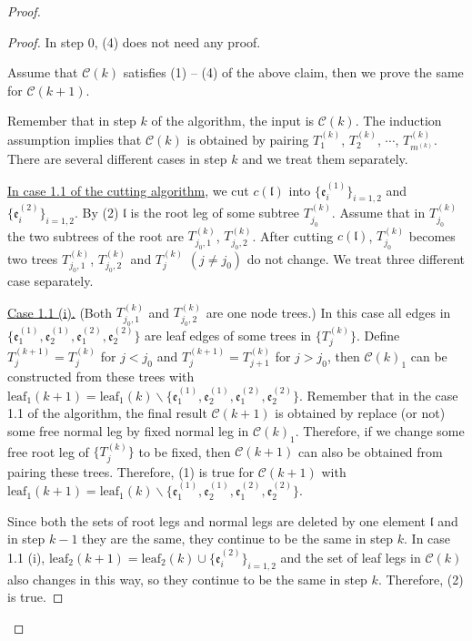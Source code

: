 \begin{proof}
\begin{proof}
In step $0$, (4) does not need any proof.

\medskip

Assume that $\mathcal{C}(k)$ satisfies (1) -- (4) of the above claim, then we prove the same for $\mathcal{C}(k+1)$.

Remember that in step $k$ of the algorithm, the input is $\mathcal{C}(k)$. The induction assumption implies that $\mathcal{C}(k)$ is obtained by pairing $T^{(k)}_1$, $T^{(k)}_2$, $\cdots$, $T^{(k)}_{m^{(k)}}$. There are several different cases in step $k$ and we treat them separately.

\underline{In case 1.1 of the cutting algorithm}, we cut $c(\mathfrak{l})$ into $\{\mathfrak{e}_{i}^{(1)}\}_{i=1,2}$ and $\{\mathfrak{e}_{i}^{(2)}\}_{i=1,2}$. By (2) $\mathfrak{l}$ is the root leg of some subtree $T^{(k)}_{j_0}$. Assume that in $T^{(k)}_{j_0}$ the two subtrees of the root are $T^{(k)}_{j_0,1}$, $T^{(k)}_{j_0,2}$. After cutting $c(\mathfrak{l})$, $T^{(k)}_{j_0}$ becomes two trees $T^{(k)}_{j_0,1}$, $T^{(k)}_{j_0,2}$ and $T^{(k)}_{j}$ $(j\ne j_0)$ do not change. We treat three different case separately.

\underline{Case 1.1 (i).} (Both $T^{(k)}_{j_0,1}$ and $T^{(k)}_{j_0,2}$ are one node trees.) In this case all edges in $\{\mathfrak{e}_{1}^{(1)}, \mathfrak{e}_{2}^{(1)}, \mathfrak{e}_{1}^{(2)}, \mathfrak{e}_{2}^{(2)}\}$ are leaf edges of some trees in $\{T_{j}^{(k)}\}$. Define $T^{(k+1)}_{j}=T^{(k)}_{j}$ for $j< j_0$ and $T^{(k+1)}_{j}=T^{(k)}_{j+1}$ for $j> j_0$, then $\mathcal{C}(k)_1$ can be constructed from these trees with $\text{leaf}_1(k+1)=\text{leaf}_1(k)\backslash\{\mathfrak{e}_{1}^{(1)}, \mathfrak{e}_{2}^{(1)}, \mathfrak{e}_{1}^{(2)}, \mathfrak{e}_{2}^{(2)}\}$. Remember that in the case 1.1 of the algorithm, the final result $\mathcal{C}(k+1)$ is obtained by replace (or not) some free normal leg by fixed normal leg in $\mathcal{C}(k)_1$. Therefore, if we change some free root leg of $\{T^{(k)}_{j}\}$ to be fixed, then $\mathcal{C}(k+1)$ can also be obtained from pairing these trees. Therefore, (1) is true for $\mathcal{C}(k+1)$ with $\text{leaf}_1(k+1)=\text{leaf}_1(k)\backslash\{\mathfrak{e}_{1}^{(1)}, \mathfrak{e}_{2}^{(1)}, \mathfrak{e}_{1}^{(2)}, \mathfrak{e}_{2}^{(2)}\}$.

Since both the sets of root legs and normal legs are deleted by one element $\mathfrak{l}$ and in step $k-1$ they are the same, they continue to be the same in step $k$. In case 1.1 (i), $\text{leaf}_2(k+1)=\text{leaf}_2(k)\cup \{\mathfrak{e}_{i}^{(2)}\}_{i=1,2}$ and the set of leaf legs in $\mathcal{C}(k)$ also changes in this way, so they continue to be the same in step $k$. Therefore, (2) is true.


\end{proof}
\end{proof}
